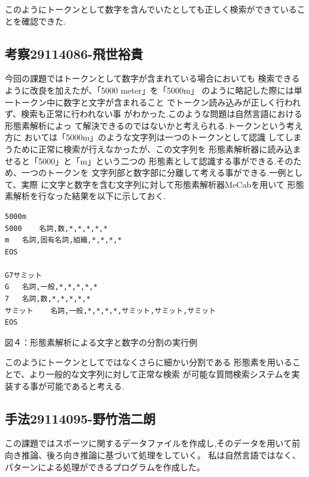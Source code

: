 \documentclass{jarticle}
\begin{document}
このようにトークンとして数字を含んでいたとしても正しく検索ができていることを確認できた.
\subsection{考察29114086-飛世裕貴}
今回の課題ではトークンとして数字が含まれている場合においても
検索できるように改良を加えたが、「5000 meter」を「5000m」
のように略記した際には単一トークン中に数字と文字が含まれること
でトークン読み込みが正しく行われず、検索も正常に行われない事
がわかった.このような問題は自然言語における形態素解析によっ
て解決できるのではないかと考えられる.トークンという考え方に
おいては「5000m」のような文字列は一つのトークンとして認識
してしまうために正常に検索が行えなかったが、この文字列を
形態素解析器に読み込ませると「5000」と「m」という二つの
形態素として認識する事ができる.そのため、一つのトークンを
文字列部と数字部に分離して考える事ができる.一例として、実際
に文字と数字を含む文字列に対して形態素解析器MeCabを用いて
形態素解析を行なった結果を以下に示しておく.\\

\begin{screen}
\begin{verbatim}
5000m
5000	名詞,数,*,*,*,*,*
m	名詞,固有名詞,組織,*,*,*,*
EOS

G7サミット
G	名詞,一般,*,*,*,*,*
7	名詞,数,*,*,*,*,*
サミット	名詞,一般,*,*,*,*,サミット,サミット,サミット
EOS
\end{verbatim}
\end{screen}
\begin{center}
図４：形態素解析による文字と数字の分割の実行例
\end{center}
このようにトークンとしてではなくさらに細かい分割である
形態素を用いることで、より一般的な文字列に対して正常な検索
が可能な質問検索システムを実装する事が可能であると考える.

\subsection{手法29114095-野竹浩二朗}
この課題ではスポーツに関するデータファイルを作成し,そのデータを用いて前向き推論、後ろ向き推論に基づいて処理をしていく。
私は自然言語ではなく、パターンによる処理ができるプログラムを作成した。
\end{document}
